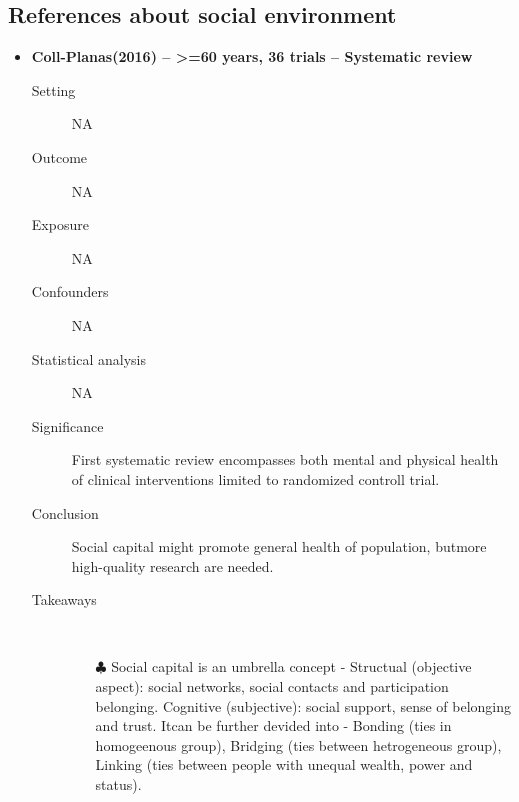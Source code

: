 \documentclass{article}
\begin{document}
\subsection{References about social environment}

\begin{itemize}
\item{\bf Coll-Planas(2016) -- >=60 years, 36 trials  -- Systematic review} 
		\begin{description}
			\item[Setting] NA 
			\item[Outcome] NA 
			\item[Exposure] NA
			\item[Confounders] NA
			\item[Statistical analysis] NA
			\item[Significance] First systematic review encompasses both mental and physical health of clinical interventions limited to randomized controll trial.
			\item[Conclusion] Social capital might promote general health of population, butmore high-quality research are needed.
			\item[Takeaways] \mbox{}\\
				\begin{itemize}
					\item[$\clubsuit$] Social capital is an umbrella concept - Structual (objective aspect): social networks, social contacts and participation belonging. Cognitive (subjective): social support, sense of belonging and trust. Itcan be further devided into - Bonding (ties in homogeenous group), Bridging (ties between hetrogeneous group), Linking (ties between people with unequal wealth, power and status).
				\end{itemize} 
		
		\end{description}
\newpage


\end{itemize}
\end{document}
